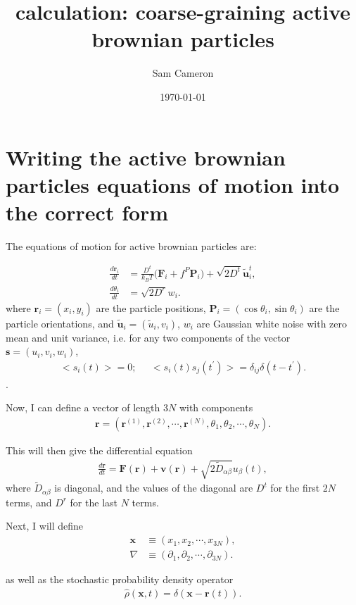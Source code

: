 \documentclass{article}
\title{calculation: coarse-graining active brownian particles}
\author{Sam Cameron}
\date{\today}
\begin{document}
\maketitle

\section{Writing the active brownian particles equations of motion into the correct form}

The equations of motion for active brownian particles are:

\begin{align}
  \frac{d\bm{r}_i}{dt}&=\frac{D^t}{k_BT}\big(\bm{F}_i
                        +f^P\bm{P}_i\big)
                        +\sqrt{2D^t}\tilde{\bm{u}}_i^t,\label{eq:micro_pos}\\
    \frac{d\theta_i}{dt}&=\sqrt{2D^r}w_i.\label{eq:micro_theta}
\end{align}
where $\bm{r}_i=(x_i,y_i)$ are the particle positions,
$\bm{P}_i=(\cos\theta_i,\sin\theta_i)$ are the particle orientations,
and $\tilde{\bm{u}}_i=(\tilde{u}_i,v_i)$, $w_i$ are Gaussian white noise
with zero mean and unit variance, i.e. for any two components of the vector
$\bm{s}=(u_i,v_i,w_i)$,
\begin{align}
  \big<s_i(t)\big>=0;\;\;\;\;\; \big<s_i(t)s_j(t^{\prime})\big>=
  \delta_{ij}\delta(t-t^{\prime}).
\end{align}.

Now, I can define a vector of length $3N$ with components
\begin{align}
  \bm{r}=(\bm{r}^{(1)},\bm{r}^{(2)},\cdots,\bm{r}^{(N)},\theta_1,\theta_2,\cdots,
  \theta_N).
\end{align}

This will then give the differential equation
\begin{align}
  \frac{d\bm{r}}{dt}=\bm{F}(\bm{r})+\bm{v}(\bm{r})
  +\sqrt{2\tilde{D}_{\alpha\beta}}u_{\beta}(t),
\end{align}
where $\tilde{D}_{\alpha\beta}$ is diagonal, and the values of the diagonal are
$D^t$ for the first $2N$ terms, and $D^r$ for the last $N$ terms.

Next, I will define
\begin{align}
  \bm{x}&\equiv(x_1,x_2,\cdots,x_{3N}),\\
  \nabla&\equiv(\partial_1,\partial_2,\cdots,\partial_{3N}).
\end{align}

as well as the stochastic probability density operator
\begin{align}
  \hat{\rho}(\bm{x},t)=\delta(\bm{x}-\bm{r}(t)).
\end{align}
\end{document}
